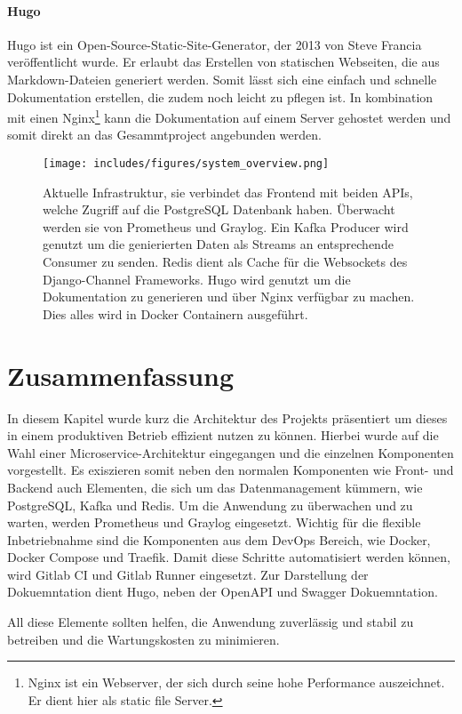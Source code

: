 \paragraph{Hugo}
\label{par:hugo}
Hugo ist ein Open-Source-Static-Site-Generator, der 2013 von Steve Francia veröffentlicht wurde. Er erlaubt das Erstellen von statischen Webseiten, die aus Markdown-Dateien generiert werden.
Somit lässt sich eine einfach und schnelle Dokumentation erstellen, die zudem noch leicht zu pflegen ist. In kombination mit einen Nginx\footnote{Nginx ist ein Webserver, der sich durch seine hohe Performance auszeichnet. Er dient hier als static file Server.} 
kann die Dokumentation auf einem Server gehostet werden und somit direkt an das Gesammtproject angebunden werden.


\begin{figure}[h]
    \centering
    \texttt{[image: includes/figures/system\_overview.png]}
    \caption{Aktuelle Infrastruktur, sie verbindet das Frontend mit beiden APIs, welche Zugriff auf die PostgreSQL Datenbank haben. Überwacht werden sie von Prometheus und Graylog. Ein Kafka Producer wird genutzt um die genierierten Daten als Streams an entsprechende Consumer zu senden. Redis dient als Cache für die Websockets des Django-Channel Frameworks. Hugo wird genutzt um die Dokumentation zu generieren und über Nginx verfügbar zu machen. Dies alles  wird in Docker Containern ausgeführt.}
\label{fig:setup}
\end{figure}


\section{Zusammenfassung}
In diesem Kapitel wurde kurz die Architektur des Projekts präsentiert um dieses in einem produktiven Betrieb effizient nutzen zu können.
Hierbei wurde auf die Wahl einer Microservice-Architektur eingegangen und die einzelnen Komponenten vorgestellt. 
Es exiszieren somit neben den normalen Komponenten wie Front- und Backend auch Elementen, die sich um das Datenmanagement kümmern, wie PostgreSQL, Kafka und Redis.
Um die Anwendung zu überwachen und zu warten, werden Prometheus und Graylog eingesetzt. Wichtig für die flexible Inbetriebnahme sind die Komponenten aus dem DevOps Bereich, wie Docker, Docker Compose und Traefik.
Damit diese Schritte automatisiert werden können, wird Gitlab CI und Gitlab Runner eingesetzt. Zur Darstellung der Dokuemntation dient Hugo, neben der OpenAPI und Swagger Dokuemntation.

All diese Elemente sollten helfen, die Anwendung zuverlässig und stabil zu betreiben und die Wartungskosten zu minimieren.
